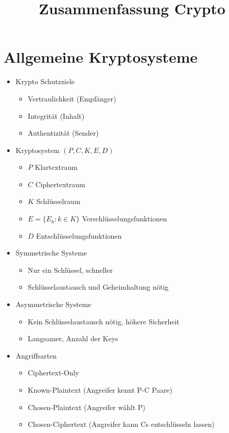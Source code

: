 \documentclass[11pt, paper=a4, twocolumn]{scrartcl}
\title{\vspace{-1.25cm}Zusammenfassung Crypto\vspace{-0.25cm}}
\date{\vspace{-5ex}}
\begin{document}
	\maketitle


	\section{Allgemeine Kryptosysteme}
		\begin{itemize}
			\item Krypto Schutzziele
				\begin{itemize}
					\item Vertraulichkeit (Empfänger)
					\item Integrität (Inhalt)
					\item Authentizität (Sender)
				\end{itemize}
			\item Kryptosystem $(P,C,K,E,D)$
				\begin{itemize}
					\item $P$ Klartextraum
					\item $C$ Ciphertextraum
					\item $K$ Schlüsselraum
					\item $E=\{E_k:k\in K\}$ Verschlüsselungsfunktionen
					\item $D$ Entschlüsselungsfunktionen
				\end{itemize}
			\item Symmetrische Systeme
				\begin{itemize}
					\item Nur ein Schlüssel, schneller
					\item Schlüsselaustausch und Geheimhaltung nötig
				\end{itemize}
			\item Asymmetrische Systeme
				\begin{itemize}
					\item  Kein Schlüsselaustausch nötig, höhere Sicherheit
					\item Langsamer, Anzahl der Keys
				\end{itemize}
			\item Angriffsarten
				\begin{itemize}
					\item Ciphertext-Only
					\item Known-Plaintext (Angreifer kennt P-C Paare)
					\item Chosen-Plaintext (Angreifer wählt P)
					\item Chosen-Ciphertext (Angreifer kann Cs entschlüsseln lassen)
				\end{itemize}
		\end{itemize}
\end{document}
